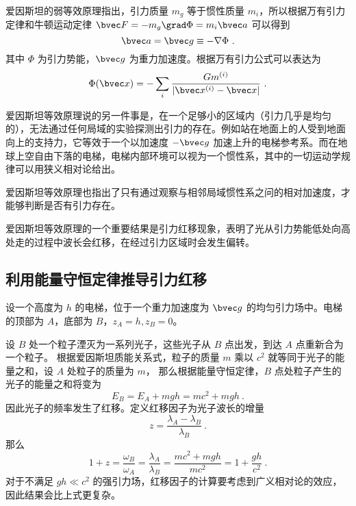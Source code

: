 

爱因斯坦的弱等效原理指出，引力质量 $m_g$ 等于惯性质量 $m_i$，所以根据万有引力定律和牛顿运动定律 $\bvec F=-m_g \grad \Phi = m_i \bvec a$ 可以得到 
\begin{equation}
\bvec a=\bvec g \equiv -\nabla\Phi~.
\end{equation}
其中 $\Phi$ 为引力势能，$\bvec g$ 为重力加速度。根据万有引力公式可以表达为
\begin{equation}
\Phi(\bvec x)=-\sum_{i} \frac{G m^{(i)}}{|\bvec x^{(i)}-\bvec x|}~.
\end{equation}

爱因斯坦等效原理说的另一件事是，在一个足够小的区域内（引力几乎是均匀的），无法通过任何局域的实验探测出引力的存在。例如站在地面上的人受到地面向上的支持力，它等效于一个以加速度 $-\bvec g$ 加速上升的电梯参考系。而在地球上空自由下落的电梯，电梯内部环境可以视为一个惯性系，其中的一切运动学规律可以用狭义相对论给出。

爱因斯坦等效原理也指出了只有通过观察与相邻局域惯性系之问的相对加速度，才能够判断是否有引力存在。

爱因斯坦等效原理的一个重要结果是引力红移现象，表明了光从引力势能低处向高处走的过程中波长会红移，在经过引力区域时会发生偏转。
\subsection{利用能量守恒定律推导引力红移}
设一个高度为 $h$ 的电梯，位于一个重力加速度为 $\bvec g$ 的均匀引力场中。电梯的顶部为 $A$，底部为 $B$，$z_A=h,z_B=0$。

设 $B$ 处一个粒子湮灭为一系列光子，这些光子从 $B$ 点出发，到达 $A$ 点重新合为一个粒子。
根据爱因斯坦质能关系式，粒子的质量 $m$ 乘以 $c^2$ 就等同于光子的能量之和，设 $A$ 处粒子的质量为 $m$，
那么根据能量守恒定律，$B$ 点处粒子产生的光子的能量之和将变为
\begin{equation}
E_B=E_A+mgh = mc^2+mgh~.
\end{equation}
因此光子的频率发生了红移。定义红移因子为光子波长的增量
\begin{equation}
z = \frac{\lambda_A-\lambda_B}{\lambda_B}~.
\end{equation}
那么
\begin{equation}\label{eq_grared_3}
1+z=\frac{\omega_B}{\omega_A} = \frac{\lambda_A}{\lambda_B} = \frac{mc^2+mgh}{mc^2} = 1+\frac{gh}{c^2}~.
\end{equation}
对于不满足 $gh\ll c^2$ 的强引力场，红移因子的计算要考虑到广义相对论的效应，因此结果会比上式更复杂。


